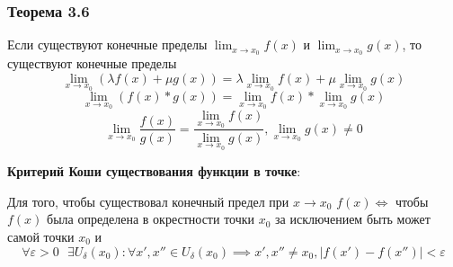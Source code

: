 \documentclass[12pt]{article}
\begin{document}
    \subsubsection*{Теорема 3.6}
    Если существуют конечные пределы $\lim_{x\to x_0}f(x)$ и $\lim_{x\to x_0}g(x)$, то существуют конечные пределы
    \[\lim_{x\to x_0}(\lambda f(x) + \mu g(x)) = \lambda\lim_{x\to x_0}f(x) + \mu \lim_{x\to x_0}g(x)\]
    \[\lim_{x \to x_0}(f(x) * g(x)) = \lim_{x\to x_0} f(x) * \lim_{x\to x_0} g(x)\]
    \[\lim_{x\to x_0}\frac{f(x)}{g(x)} = \frac{\lim_{x\to x_0}f(x)}{\lim_{x\to x_0}g(x)}, \lim_{x\to x_0}g(x) \ne 0\]
    
    \noindent\textbf{Критерий Коши существования функции в точке}:
    \begin{adjustwidth}{1.5em}{1.5em}
        Для того, чтобы существовал конечный предел при $x \to x_0$ $f(x) \Leftrightarrow$ чтобы $f(x)$ была определена в окрестности точки $x_0$ за исключением быть может самой точки $x_0$ и 
        \[ \forall \varepsilon > 0 \text{ } \exists U_\delta(x_0): \forall x', x'' \in U_\delta(x_0) \implies x', x'' \ne x_0, |f(x') - f(x'')| < \varepsilon \]
    \end{adjustwidth}
    
\end{document}
